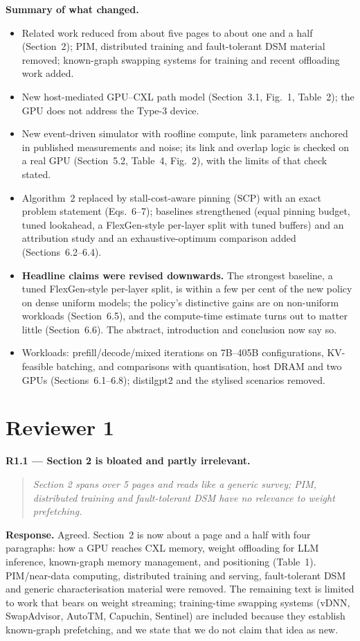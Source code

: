 \documentclass[11pt]{article}
\newcommand{\rc}[1]{\par\medskip\noindent\textbf{#1}}
\newenvironment{comment}{\begin{quote}\itshape}{\end{quote}}
\begin{document}
\textbf{Summary of what changed.}
\begin{itemize}[nosep]
\item Related work reduced from about five pages to about one and a half (Section~2); PIM, distributed training and fault-tolerant DSM material removed; known-graph swapping systems for training and recent offloading work added.
\item New host-mediated GPU--CXL path model (Section~3.1, Fig.~1, Table~2); the GPU does not address the Type-3 device.
\item New event-driven simulator with roofline compute, link parameters anchored in published measurements and noise; its link and overlap logic is checked on a real GPU (Section~5.2, Table~4, Fig.~2), with the limits of that check stated.
\item Algorithm~2 replaced by stall-cost-aware pinning (SCP) with an exact problem statement (Eqs.~6--7); baselines strengthened (equal pinning budget, tuned lookahead, a FlexGen-style per-layer split with tuned buffers) and an attribution study and an exhaustive-optimum comparison added (Sections~6.2--6.4).
\item \textbf{Headline claims were revised downwards.} The strongest baseline, a tuned FlexGen-style per-layer split, is within a few per cent of the new policy on dense uniform models; the policy's distinctive gains are on non-uniform workloads (Section~6.5), and the compute-time estimate turns out to matter little (Section~6.6). The abstract, introduction and conclusion now say so.
\item Workloads: prefill/decode/mixed iterations on 7B--405B configurations, KV-feasible batching, and comparisons with quantisation, host DRAM and two GPUs (Sections~6.1--6.8); distilgpt2 and the stylised scenarios removed.
\end{itemize}

\section*{Reviewer 1}

\rc{R1.1 --- Section 2 is bloated and partly irrelevant.}
\begin{comment}Section 2 spans over 5 pages and reads like a generic survey; PIM, distributed training and fault-tolerant DSM have no relevance to weight prefetching.\end{comment}
\textbf{Response.} Agreed. Section~2 is now about a page and a half with four paragraphs: how a GPU reaches CXL memory, weight offloading for LLM inference, known-graph memory management, and positioning (Table~1). PIM/near-data computing, distributed training and serving, fault-tolerant DSM and generic characterisation material were removed. The remaining text is limited to work that bears on weight streaming; training-time swapping systems (vDNN, SwapAdvisor, AutoTM, Capuchin, Sentinel) are included because they establish known-graph prefetching, and we state that we do not claim that idea as new.
\end{document}
